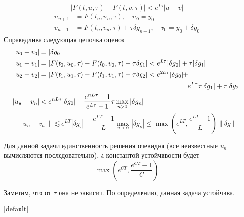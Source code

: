 \documentclass[professionalfonts,compress,unicode]{beamer}
\begin{document}
{
	$$
	|F(t,u,\tau)-F(t,v,\tau)| < e^{L\tau} |u-v|
	$$
	\begin{align*}
	u_{n+1} &= F(t_n, u_n, \tau), \quad u_0 = y_0\\
	v_{n+1} &= F(t_n, v_n, \tau) + \tau \delta g_{n+1}, \quad v_0 = y_0 + \delta g_0
	\end{align*}
	Справедлива следующая цепочка оценок
	\begin{align*}
	|u_0 - v_0| &= |\delta g_0|\\
	|u_1 - v_1| &= |F(t_0, u_0, \tau)-F(t_0, v_0, \tau) - \tau \delta g_1| < 
		e^{L\tau} |\delta g_0| + \tau |\delta g_1|\\
	|u_2 - v_2| &= |F(t_1, u_1, \tau)-F(t_1, v_1, \tau) - \tau \delta g_2| < 
		e^{2L\tau} |\delta g_0| + \\
				& \hspace{.63\textwidth} e^{L\tau} \tau |\delta g_1| + \tau |\delta g_2|\\
	|u_n - v_n| &< e^{n L\tau}|\delta g_0| + \frac{e^{n L\tau}-1}{e^{L\tau}-1}\tau\max_{n>0} |\delta g_n|
	\end{align*}
	$$\|u_n - v_n\| \lesssim e^{LT} |\delta g_0| + \frac{e^{LT}-1}{L} \max_{n>0} |\delta g_n| \leq
	\max\left(e^{LT}, \frac{e^{LT}-1}{L}\right) \|\delta g\|$$
}

{
	Для данной задачи единственность решения очевидна (все неизвестные $u_n$ вычисляются последовательно), 
	а константой устойчивости будет
	$$
	\max\left(e^{CT}, \frac{e^{CT}-1}{C}\right)
	$$
	
	Заметим, что от $\tau$ она не зависит. По определению, данная задача устойчива.
}
{
[default] 
}
\end{document}
